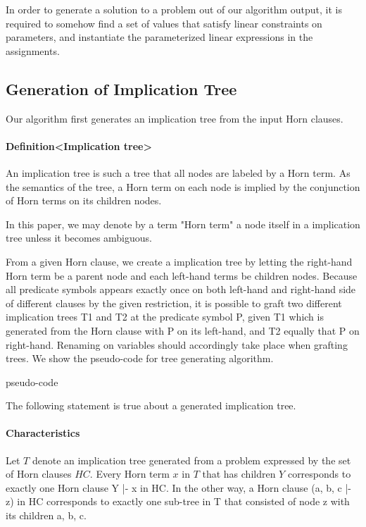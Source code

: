 \documentclass{llncs}
\begin{document}
In order to generate a solution to a problem out of our algorithm output, it is required to somehow find a set of values that satisfy linear constraints on parameters, and instantiate the parameterized linear expressions in the assignments.

\subsection{Generation of Implication Tree}

Our algorithm first generates an implication tree from the input Horn clauses.

\paragraph{Definition<Implication tree>} An implication tree is such a tree that all nodes are labeled by a Horn term. As the semantics of the tree, a Horn term on each node is implied by the conjunction of Horn terms on its children nodes.

In this paper, we may denote by a term "Horn term" a node itself in a implication tree unless it becomes ambiguous.

From a given Horn clause, we create a implication tree by letting the right-hand Horn term  be a parent node and each left-hand terms be children nodes. Because all predicate symbols appears exactly once on both left-hand and right-hand side of different clauses by the given restriction, it is possible to graft two different implication trees T1 and T2 at the predicate symbol P, given T1 which is generated from the Horn clause with P on its left-hand, and T2 equally that P on right-hand. Renaming on variables should accordingly take place when grafting trees. We show the pseudo-code for tree generating algorithm.

\begin{algorithm}
\caption{$\mbox{\sc BuildTree}$}
\begin{algorithmic}
\item pseudo-code
\end{algorithmic}
\end{algorithm}

The following statement is true about a generated implication tree.

\paragraph{Characteristics} Let $T$ denote an implication tree generated from a problem expressed by the set of Horn clauses $HC$. Every Horn term $x$ in $T$ that has children $Y$ corresponds to exactly one Horn clause Y |- x in HC. In the other way, a Horn clause (a, b, c |- z) in HC corresponds to exactly one sub-tree in T that consisted of node z with its children a, b, c.
\end{document}
